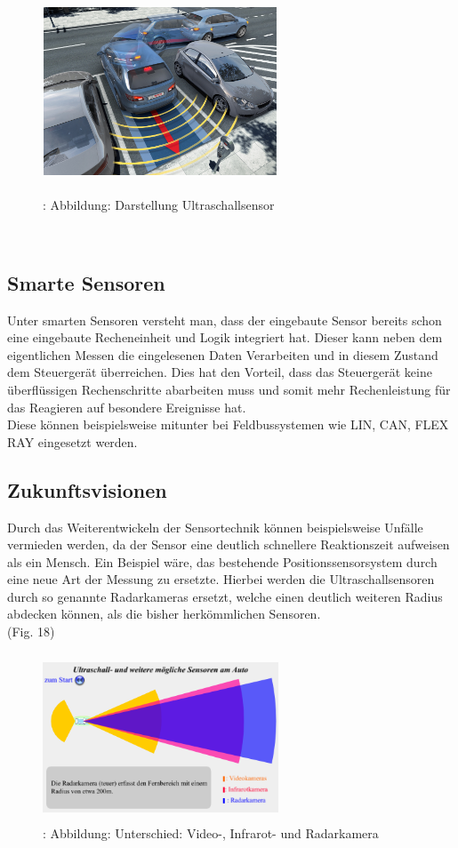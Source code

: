 	\begin{figure}
		\includegraphics[width=7cm, height=5cm] {ultraschall.png}
		\caption {\\\cite{TS_ultraschall_pic}: Abbildung: Darstellung Ultraschallsensor}
	\end{figure}\\
	
	
	
	\subsection{Smarte Sensoren} 
	Unter smarten Sensoren versteht man, dass der eingebaute Sensor bereits schon eine eingebaute Recheneinheit und Logik integriert hat. Dieser kann neben dem eigentlichen Messen die eingelesenen Daten Verarbeiten und in diesem Zustand dem Steuergerät überreichen. Dies hat den Vorteil, dass das Steuergerät keine überflüssigen Rechenschritte abarbeiten muss und somit mehr Rechenleistung für das Reagieren auf besondere Ereignisse hat.\\
	Diese können beispielsweise mitunter bei Feldbussystemen wie LIN, CAN, FLEX RAY eingesetzt werden.		
	
	
	
	\subsection{Zukunftsvisionen} 
	Durch das Weiterentwickeln der Sensortechnik können beispielsweise Unfälle vermieden werden, da der Sensor eine deutlich schnellere Reaktionszeit aufweisen als ein Mensch. Ein Beispiel wäre, das bestehende Positionssensorsystem durch eine neue Art der Messung zu ersetzte. Hierbei werden die Ultraschallsensoren durch so genannte Radarkameras ersetzt, welche einen deutlich weiteren Radius abdecken können, als die bisher herkömmlichen Sensoren.\\(Fig. 18)
	
	\begin{figure}
		\includegraphics[width=7cm, height=5cm] {radarsensor.png}
		\caption {\cite{TS_kamera_pic}: Abbildung: Unterschied: Video-, Infrarot- und Radarkamera}
	\end{figure}
	
